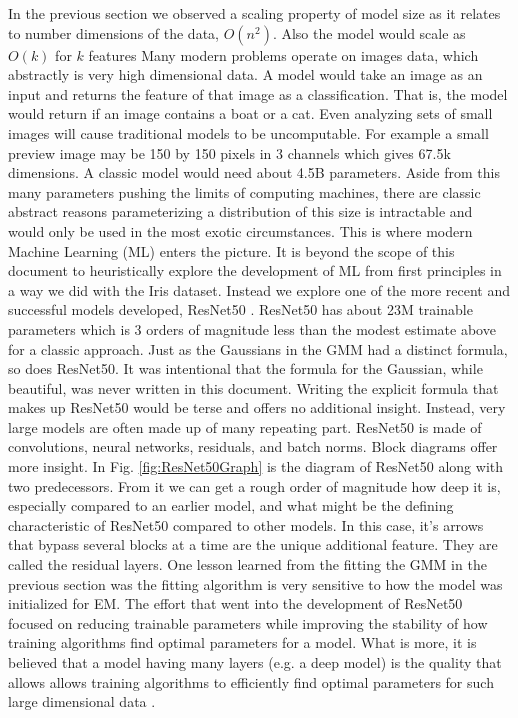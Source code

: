 In the previous section we observed a scaling property of model size as it relates to number dimensions of the data, $O(n^2)$. Also the model would scale as $O(k)$ for $k$ features Many modern problems operate on images data, which abstractly is very high dimensional data. A model would take an image as an input and returns the feature of that image as a classification. That is, the model would return if an image contains a boat or a cat. Even analyzing sets of small images will cause traditional models to be uncomputable. For example a small preview image may be 150 by 150 pixels in 3 channels which gives 67.5k dimensions. A classic model would need about 4.5B parameters. Aside from this many parameters pushing the limits of computing machines, there are classic abstract reasons parameterizing a distribution of this size is intractable and would only be used in the most exotic circumstances. This is where modern Machine Learning (ML) enters the picture. It is beyond the scope of this document to heuristically explore the development of ML from first principles in a way we did with the Iris dataset. Instead we explore one of the more recent and successful models developed, ResNet50 \cite{ResNet50:He}. ResNet50 has about 23M trainable parameters which is 3 orders of magnitude less than the modest estimate above for a classic approach. Just as the Gaussians in the  GMM had a distinct formula, so does ResNet50. It was intentional that the formula for the Gaussian, while beautiful, was never written in this document. Writing the explicit formula that makes up ResNet50 would be terse and offers no additional insight. Instead, very large models are often made up of many repeating part. ResNet50 is made of convolutions, neural networks, residuals, and batch norms. Block diagrams offer more insight. In Fig. \ref{fig:ResNet50Graph} is the diagram of ResNet50 along with two predecessors. From it we can get a rough order of magnitude how deep it is, especially compared to an earlier model, and what might be the defining characteristic of ResNet50 compared to other models. In this case, it's arrows that bypass several blocks at a time are the unique additional feature. They are called the residual layers. One lesson learned from the fitting the GMM in the previous section was the fitting algorithm is very sensitive to how the model was initialized for EM. The effort that went into the development of ResNet50 focused on reducing trainable parameters while improving the stability of how training algorithms find optimal parameters for a model. What is more, it is believed that a model having many layers (e.g. a deep model) is the quality that allows allows training algorithms to efficiently find optimal parameters for such large dimensional data \cite{nguyen2018on} \cite{janocha2017loss}.

